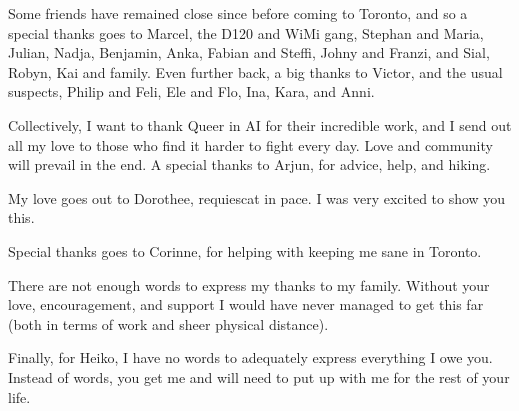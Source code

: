Some friends have remained close since before coming to Toronto, and so a special thanks goes to Marcel, the D120 and WiMi gang, Stephan and Maria, Julian, Nadja, Benjamin, Anka, Fabian and Steffi, Johny and Franzi, and Sial, Robyn, Kai and family. Even further back, a big thanks to Victor, and the usual suspects, Philip and Feli, Ele and Flo, Ina, Kara, and Anni.

Collectively, I want to thank Queer in AI for their incredible work, and I send out all my love to those who find it harder to fight every day.
Love and community will prevail in the end.
A special thanks to Arjun, for advice, help, and hiking.

My love goes out to Dorothee, requiescat in pace.
I was very excited to show you this.

Special thanks goes to Corinne, for helping with keeping me sane in Toronto.

There are not enough words to express my thanks to my family.
Without your love, encouragement, and support I would have never managed to get this far (both in terms of work and sheer physical distance).

Finally, for Heiko, I have no words to adequately express everything I owe you.
Instead of words, you get me and will need to put up with me for the rest of your life.